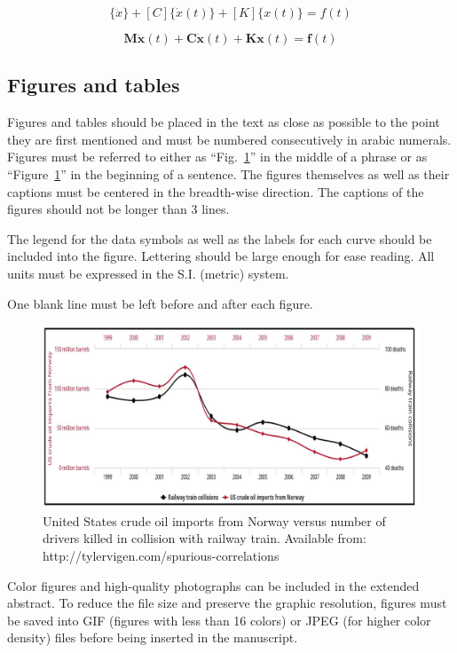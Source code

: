 \documentclass[10pt,fleqn,a4paper,twoside]{article}
\begin{document}
\begin{equation}
[M]\{\ddot{x}\}+[C]\{\dot{x}(t)\}+[K]\{x(t)\}={f(t)}
\label{eq1}
\end{equation}

\begin{equation}
\mathbf{M\ddot{x}}(t)+\mathbf{C\dot{x}}(t)+\mathbf{Kx}(t)=\mathbf{f}(t)
\label{eq2}
\end{equation}

\subsection{Figures and tables}

Figures and tables should be placed in the text as close as possible to the point they are first mentioned and must be numbered consecutively in arabic numerals. Figures must be referred to either as ``Fig.~\ref{fig1}'' in the middle of a phrase or as ``Figure~\ref{fig1}'' in the beginning of a sentence. The figures themselves as well as their captions must be centered in the breadth-wise direction. The captions of the figures should not be longer than 3 lines.

The legend for the data symbols as well as the labels for each curve should be included into the figure. Lettering should be large enough for ease reading. All units must be expressed in the S.I. (metric) system.

One blank line must be left before and after each figure.

\begin{figure}[h!]
\centering
\includegraphics[angle=0, scale=0.320]{figure.jpeg}
\caption{United States crude oil imports from Norway versus number of drivers killed in collision with railway train. Available from: http://tylervigen.com/spurious-correlations}
\label{fig1}
\end{figure}

Color figures and high-quality photographs can be included in the extended abstract. To reduce the file size and preserve the graphic resolution, figures must be saved into GIF (figures with less than 16 colors) or JPEG (for higher color density) files before being inserted in the manuscript.
\end{document}
